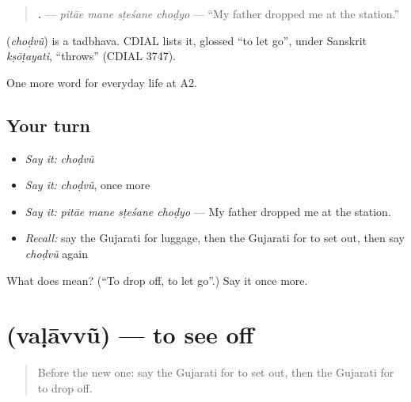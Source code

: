 \begin{quote}
\textbf{   .} — \emph{pitāe mane sṭeśane choḍyo} — \textquotedblleft{}My father dropped me at the station.\textquotedblright{}
\end{quote}

\begin{cousinweb}
\textbf{} (\emph{choḍvũ}) is a tadbhava. CDIAL lists it, glossed \textquotedblleft{}to let go\textquotedblright{}, under Sanskrit \emph{kṣōṭayati}, \textquotedblleft{}throws\textquotedblright{} (CDIAL 3747).
\end{cousinweb}

\begin{grammarlens}[title={What you've built}]
One more word for everyday life at A2.
\end{grammarlens}

\subsection*{Your turn}
\begin{itemize}
\raggedright
  \item \emph{Say it:} \emph{choḍvũ}
  \item \emph{Say it:} \emph{choḍvũ}, once more
  \item \emph{Say it:} \emph{pitāe mane sṭeśane choḍyo} — My father dropped me at the station.
  \item \emph{Recall:} say the Gujarati for luggage, then the Gujarati for to set out, then say \emph{choḍvũ} again
\end{itemize}

\begin{tcolorbox}[breakable,colback=teal!4,colframe=teal!35!black,title={Before you move on}]
What does  mean? (\textquotedblleft{}To drop off, to let go\textquotedblright{}.) Say it once more.
\end{tcolorbox}
\section[\texorpdfstring{\gu{વળાવવું} (vaḷāvvũ)}{વળાવવું (vaḷāvvũ)}]{ (vaḷāvvũ) — to see off}

\label{lesson:GU-C203-valavvu}



\begin{quote}
Before the new one: say the Gujarati for to set out, then the Gujarati for to drop off.
\end{quote}

